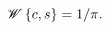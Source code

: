$\mathop{\mathscr{W}\/}\nolimits\left\{\mathop{c\/}\nolimits,\mathop{s\/}%
\nolimits\right\}=1/\pi.$